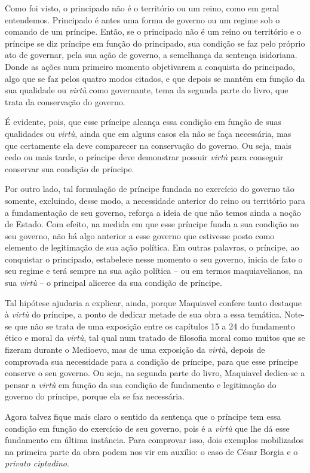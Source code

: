 Como foi visto, o principado não é o território ou um reino, como em
geral entendemos. Principado é antes uma forma de governo ou um regime
sob o comando de um príncipe. Então, se o principado não é um reino ou
território e o príncipe se diz príncipe em função do principado, sua
condição se faz pelo próprio ato de governar, pela sua ação de governo,
a semelhança da sentença isidoriana. Donde as ações num primeiro momento
objetivarem a conquista do principado, algo que se faz pelos quatro
modos citados, e que depois se mantém em função da sua qualidade ou
\emph{virtù} como governante, tema da segunda parte do livro, que trata
da conservação do governo.

É evidente, pois, que esse príncipe alcança essa condição em função de
suas qualidades ou \emph{virtù}, ainda que em alguns casos ela não se
faça necessária, mas que certamente ela deve comparecer na conservação
do governo. Ou seja, mais cedo ou mais tarde, o príncipe deve demonstrar
possuir \emph{virtù} para conseguir conservar sua condição de príncipe.

Por outro lado, tal formulação de príncipe fundada no exercício do
governo tão somente, excluindo, desse modo, a necessidade anterior do
reino ou território para a fundamentação de seu governo, reforça a ideia
de que não temos ainda a noção de Estado. Com efeito, na medida em que
esse príncipe funda a sua condição no seu governo, não há algo anterior
a esse governo que estivesse posto como elemento de legitimação de sua
ação política. Em outras palavras, o príncipe, ao conquistar o
principado, estabelece nesse momento o seu governo, inicia de fato o seu
regime e terá sempre na sua ação política -- ou em termos
maquiavelianos, na sua \emph{virtù} -- o principal alicerce da sua
condição de príncipe.

Tal hipótese ajudaria a explicar, ainda, porque Maquiavel confere tanto
destaque à \emph{virtù} do príncipe, a ponto de dedicar metade de sua
obra a essa temática. Note-se que não se trata de uma exposição entre os
capítulos 15 a 24 do fundamento ético e moral da \emph{virtù}, tal qual
num tratado de filosofia moral como muitos que se fizeram durante o
Medioevo, mas de uma exposição da \emph{virtù,} depois de comprovada sua
necessidade para a condição de príncipe, para que esse príncipe conserve
o seu governo. Ou seja, na segunda parte do livro, Maquiavel dedica-se a
pensar a \emph{virtù} em função da sua condição de fundamento e
legitimação do governo do príncipe, porque ela se faz necessária.

Agora talvez fique mais claro o sentido da sentença que o príncipe tem
essa condição em função do exercício de seu governo, pois é a
\emph{virtù} que lhe dá esse fundamento em última instância. Para
comprovar isso, dois exemplos mobilizados na primeira parte da obra
podem nos vir em auxílio: o caso de César Borgia e o \emph{privato
ciptadino}.

